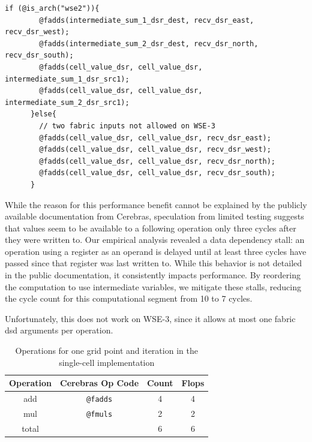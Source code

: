 
\begin{lstlisting}[language=CSL, caption={CSL code for the single-cell implementation}, label={lst:single_cell_implementation}]
    if (@is_arch("wse2")){
        @fadds(intermediate_sum_1_dsr_dest, recv_dsr_east, recv_dsr_west);
        @fadds(intermediate_sum_2_dsr_dest, recv_dsr_north, recv_dsr_south);
        @fadds(cell_value_dsr, cell_value_dsr, intermediate_sum_1_dsr_src1);
        @fadds(cell_value_dsr, cell_value_dsr, intermediate_sum_2_dsr_src1);
      }else{
        // two fabric inputs not allowed on WSE-3
        @fadds(cell_value_dsr, cell_value_dsr, recv_dsr_east);
        @fadds(cell_value_dsr, cell_value_dsr, recv_dsr_west);
        @fadds(cell_value_dsr, cell_value_dsr, recv_dsr_north);
        @fadds(cell_value_dsr, cell_value_dsr, recv_dsr_south);
      }
\end{lstlisting}


While the reason for this performance benefit cannot be explained by the publicly available documentation from Cerebras, speculation from limited testing suggests that values seem to be available to a following operation only three cycles after they were written to.
Our empirical analysis revealed a data dependency stall: an operation using a register as an operand is delayed until at least three cycles have passed since that register was last written to. While this behavior is not detailed in the public documentation, it consistently impacts performance. By reordering the computation to use intermediate variables, we mitigate these stalls, reducing the cycle count for this computational segment from 10 to 7 cycles.

Unfortunately, this does not work on WSE-3, since it allows at most one fabric \ac{dsd} arguments per operation.

\begin{table}[h]
    \centering
    \caption{Operations for one grid point and iteration in the single-cell implementation}
    \label{tab:r1_non_tiled_operations}
    \begin{tabular}{@{}cccc@{}}
        \toprule
        Operation & Cerebras Op Code & Count & Flops \\
        \midrule
        add & \texttt{@fadds} & \num{4} & \num{4} \\
        mul & \texttt{@fmuls} & \num{2} & \num{2} \\
        \midrule
        total & & \num{6} & \num{6} \\
        \bottomrule
    \end{tabular}
\end{table}

